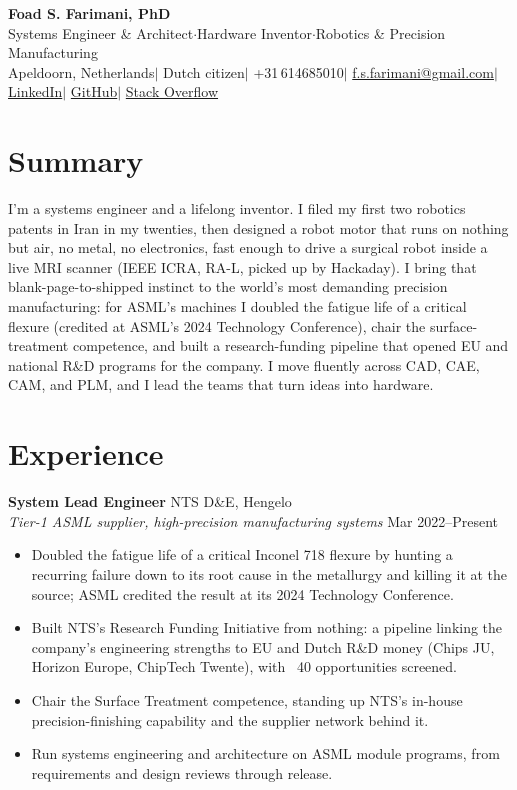 \documentclass[10pt,a4paper]{article}
\begin{document}
\begin{center}
  {\LARGE\bfseries Foad S. Farimani, PhD} \\[3pt]
  {\small Systems Engineer \& Architect\enspace$\cdot$\enspace Hardware Inventor\enspace$\cdot$\enspace Robotics \& Precision Manufacturing}
  \\[3pt]
  {\footnotesize
    Apeldoorn, Netherlands\enspace$\mid$\enspace
    Dutch citizen\enspace$\mid$\enspace
    +31\,614685010\enspace$\mid$\enspace
    \href{mailto:f.s.farimani@gmail.com}{f.s.farimani@gmail.com}\enspace$\mid$\enspace
    \href{https://linkedin.com/in/fsfarimani}{LinkedIn}\enspace$\mid$\enspace
    \href{https://github.com/Foadsf}{GitHub}\enspace$\mid$\enspace
    \href{https://stackoverflow.com/users/4999991}{Stack Overflow}
  }
\end{center}

\section{Summary}
I'm a systems engineer and a lifelong inventor. I filed my first two robotics patents in Iran in my twenties, then designed a robot motor that runs on nothing but air, no metal, no electronics, fast enough to drive a surgical robot inside a live MRI scanner (IEEE ICRA, RA-L, picked up by Hackaday). I bring that blank-page-to-shipped instinct to the world's most demanding precision manufacturing: for ASML's machines I doubled the fatigue life of a critical flexure (credited at ASML's 2024 Technology Conference), chair the surface-treatment competence, and built a research-funding pipeline that opened EU and national R\&D programs for the company. I move fluently across CAD, CAE, CAM, and PLM, and I lead the teams that turn ideas into hardware.

\section{Experience}

\textbf{System Lead Engineer} \hfill NTS D\&E, Hengelo \\
{\small\textit{Tier-1 ASML supplier, high-precision manufacturing systems}} \hfill {\small Mar 2022--Present}
\begin{itemize}
  \item Doubled the fatigue life of a critical Inconel 718 flexure by hunting a recurring failure down to its root cause in the metallurgy and killing it at the source; ASML credited the result at its 2024 Technology Conference.
  \item Built NTS's Research Funding Initiative from nothing: a pipeline linking the company's engineering strengths to EU and Dutch R\&D money (Chips JU, Horizon Europe, ChipTech Twente), with ~40 opportunities screened.
  \item Chair the Surface Treatment competence, standing up NTS's in-house precision-finishing capability and the supplier network behind it.
  \item Run systems engineering and architecture on ASML module programs, from requirements and design reviews through release.
\end{itemize}
\end{document}
